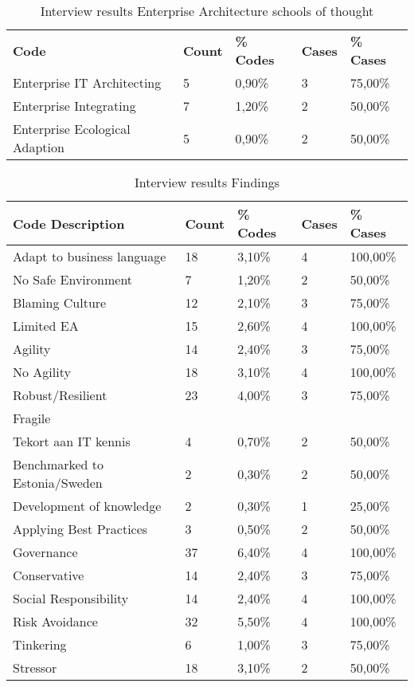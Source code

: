 \begin{table}[htbp]
	\centering
	\begin{tabular}{lllll}
		\toprule
		\textbf{Code} & \textbf{Count} & \textbf{\% Codes} & \textbf{Cases} & \textbf{\% Cases} \\
		Enterprise IT Architecting & 5     & 0,90\% & 3     & 75,00\% \\
		Enterprise Integrating & 7     & 1,20\% & 2     & 50,00\% \\
		Enterprise Ecological Adaption & 5     & 0,90\% & 2     & 50,00\% \\
		\bottomrule
	\end{tabular}%
	\caption{Interview results Enterprise Architecture schools of thought}%
	\label{tab:interviewresultseaschools}%
\end{table}%


\begin{table}[htbp]
	\centering
	\begin{tabular}{lllll}
		\toprule
		\textbf{Code} \textbf{Description} & \textbf{Count} & \textbf{\% Codes} & \textbf{Cases} & \textbf{\% Cases} \\
		\midrule
		Adapt to business language & 18    & 3,10\% & 4     & 100,00\% \\
		No Safe Environment & 7     & 1,20\% & 2     & 50,00\% \\
		Blaming Culture & 12    & 2,10\% & 3     & 75,00\% \\
		Limited EA & 15    & 2,60\% & 4     & 100,00\% \\
		Agility & 14    & 2,40\% & 3     & 75,00\% \\
		No Agility & 18    & 3,10\% & 4     & 100,00\% \\
		Robust/Resilient & 23    & 4,00\% & 3     & 75,00\% \\
		Fragile &       &       &       &  \\
		Tekort aan IT kennis & 4     & 0,70\% & 2     & 50,00\% \\
		Benchmarked to Estonia/Sweden & 2     & 0,30\% & 2     & 50,00\% \\
		Development of knowledge & 2     & 0,30\% & 1     & 25,00\% \\
		Applying Best Practices & 3     & 0,50\% & 2     & 50,00\% \\
		Governance & 37    & 6,40\% & 4     & 100,00\% \\
		Conservative & 14    & 2,40\% & 3     & 75,00\% \\
		Social Responsibility & 14    & 2,40\% & 4     & 100,00\% \\
		Risk Avoidance & 32    & 5,50\% & 4     & 100,00\% \\
		Tinkering & 6     & 1,00\% & 3     & 75,00\% \\
		Stressor & 18    & 3,10\% & 2     & 50,00\% \\
		\bottomrule
	\end{tabular}%
	\caption{Interview results Findings}%
	\label{tab:interviewresultsfindings}%
\end{table}%


